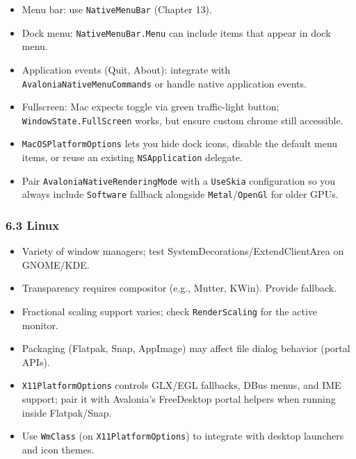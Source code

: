 \begin{itemize}
\tightlist
\item
  Menu bar: use \passthrough{\lstinline!NativeMenuBar!} (Chapter 13).
\item
  Dock menu: \passthrough{\lstinline!NativeMenuBar.Menu!} can include
  items that appear in dock menu.
\item
  Application events (Quit, About): integrate with
  \passthrough{\lstinline!AvaloniaNativeMenuCommands!} or handle native
  application events.
\item
  Fullscreen: Mac expects toggle via green traffic-light button;
  \passthrough{\lstinline!WindowState.FullScreen!} works, but ensure
  custom chrome still accessible.
\item
  \passthrough{\lstinline!MacOSPlatformOptions!} lets you hide dock
  icons, disable the default menu items, or reuse an existing
  \passthrough{\lstinline!NSApplication!} delegate.
\item
  Pair \passthrough{\lstinline!AvaloniaNativeRenderingMode!} with a
  \passthrough{\lstinline!UseSkia!} configuration so you always include
  \passthrough{\lstinline!Software!} fallback alongside
  \passthrough{\lstinline!Metal!}/\passthrough{\lstinline!OpenGl!} for
  older GPUs.
\end{itemize}

\subsubsection{6.3 Linux}\label{linux}

\begin{itemize}
\tightlist
\item
  Variety of window managers; test SystemDecorations/ExtendClientArea on
  GNOME/KDE.
\item
  Transparency requires compositor (e.g., Mutter, KWin). Provide
  fallback.
\item
  Fractional scaling support varies; check
  \passthrough{\lstinline!RenderScaling!} for the active monitor.
\item
  Packaging (Flatpak, Snap, AppImage) may affect file dialog behavior
  (portal APIs).
\item
  \passthrough{\lstinline!X11PlatformOptions!} controls GLX/EGL
  fallbacks, DBus menus, and IME support; pair it with Avalonia's
  FreeDesktop portal helpers when running inside Flatpak/Snap.
\item
  Use \passthrough{\lstinline!WmClass!} (on
  \passthrough{\lstinline!X11PlatformOptions!}) to integrate with
  desktop launchers and icon themes.
\end{itemize}

